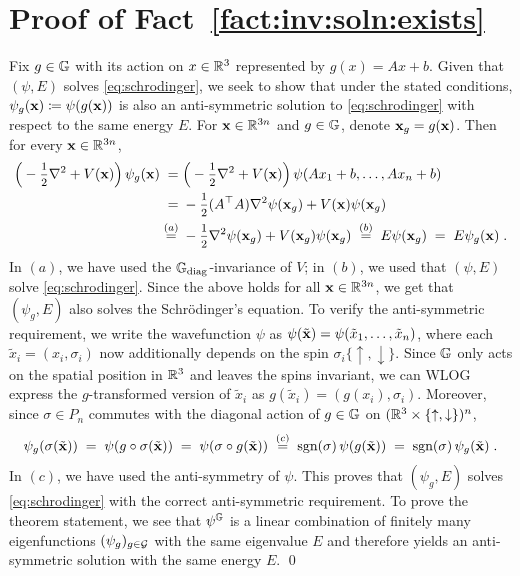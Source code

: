 
\section{Proof of Fact~\ref{fact:inv:soln:exists}} \label{appendix:proof:inv:soln}

\noindent
Fix $g \in \mathbb{G}$ with its action on $x \in \mathbb{R}^3$ represented by $g(x) = A x + b$. Given that $(\psi, E)$ solves \eqref{eq:schrodinger}, we seek to show that under the stated conditions, $\psi_g(\mathbf{x}) \coloneqq \psi(g(\mathbf{x}))$ is also an anti-symmetric solution to \eqref{eq:schrodinger} with respect to the same energy $E$. For $\mathbf{x} \in \mathbb{R}^{3n}$ and $g \in \mathbb{G}$, denote $\mathbf{x}_g = g(\mathbf{x})$. Then for every $\mathbf{x} \in \mathbb{R}^{3n}$, 
\begin{align*}
    \Big( - \mfrac{1}{2} \nabla^2 + V(\bx) \Big) \, \psi_{g}( \bx )
    \;=&\; 
    \Big( - \mfrac{1}{2} \nabla^2 + V(\bx) \Big) \, \psi(  A x_1 + b, \ldots, A x_n + b )
    \\
    \;=&\;  
    - \mfrac{1}{2} (A^\top A) \nabla^2  \psi( \bx_{g} )
    + V( \bx ) \psi( \bx_{g} )
    \\
    \;\overset{(a)}{=}&\;
    - \mfrac{1}{2} \nabla^2  \psi( \bx_{g})
    + V( \bx_{g} ) \psi( \bx_{g})
    \;\overset{(b)}{=}\; 
    E \psi( \bx_{g} )
    \;=\; 
    E \psi_{g}( \bx )
    \;.
\end{align*}
In $(a)$, we have used the $\mathbb{G}_{\text{\rm diag}}$-invariance of $V$;  in $(b)$, we used that $(\psi, E)$ solve \eqref{eq:schrodinger}. Since the above holds for all $\mathbf{x} \in \mathbb{R}^{3n} $, we get that $(\psi_{g},E)$ also solves the Schr\"odinger's equation. To verify the anti-symmetric requirement, we write the wavefunction $\psi$ as $\psi(\tilde {\mathbf{x}}) = \psi(\tilde x_1, \ldots, \tilde x_n)$, where each $\tilde x_i = (x_i, \sigma_i)$ now additionally depends on the spin $\sigma_i \{ \uparrow, \downarrow\}$. Since $\mathbb{G}$ only acts on the spatial position in $\mathbb{R}^3$ and leaves the spins invariant, we can WLOG express the $g$-transformed version of $\tilde x_i$ as $g(\tilde x_i) = (g(x_i), \sigma_i)$. Moreover, since $\sigma \in P_n$ commutes with the diagonal action of $g \in \mathbb{G}$ on $(\mathbb{R}^3 \times \{\uparrow, \downarrow\})^n$, 
\begin{align*}
    \psi_g( \sigma(\tilde {\mathbf{x}}) )
    \;=\; 
    \psi( g \circ \sigma (\tilde {\mathbf{x}}) )
    \;=\;
    \psi( \sigma \circ g(\tilde {\mathbf{x}}) ) 
    \;\overset{(c)}{=}\; 
    \textrm{sgn}(\sigma) \, \psi( g(\tilde {\mathbf{x}}) ) 
    \;=\; 
    \textrm{sgn}(\sigma) \, \psi_g( \tilde {\mathbf{x}} ) \;.
\end{align*}
In $(c)$, we have used the anti-symmetry of $\psi$. This proves that $(\psi_{g},E)$ solves \eqref{eq:schrodinger} with the correct anti-symmetric requirement. To prove the theorem statement, we see that $\psi^{\mathbb{G}}$ is a linear combination of finitely many eigenfunctions $(\psi_{g})_{g \in \mathcal{G}}$ with the same eigenvalue $E$ and therefore yields an anti-symmetric solution with the same energy $E$. 
\qed 


